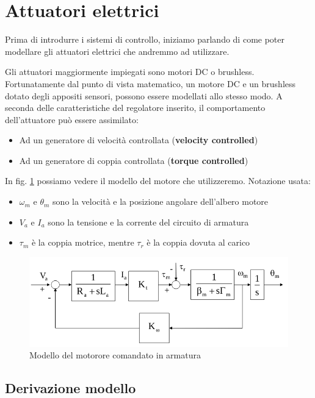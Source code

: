\section{Attuatori elettrici}
Prima di introdurre i sistemi di controllo, iniziamo parlando di come poter modellare gli attuatori elettrici che andremmo ad utilizzare.

Gli attuatori maggiormente impiegati sono motori DC o brushless. Fortunatamente dal punto di vista matematico, un motore DC e un brushless dotato degli appositi sensori, possono essere modellati allo stesso modo.
A seconda delle caratteristiche del regolatore inserito, il comportamento dell’attuatore può essere assimilato:
\begin{itemize}
	\item Ad un generatore di velocità controllata (\textbf{velocity controlled})
	\item Ad un generatore di coppia controllata (\textbf{torque controlled})
\end{itemize}

In fig. \ref{fig:electricactuator1} possiamo vedere il modello del motore che utilizzeremo. Notazione usata:

\begin{itemize}
	\item $\omega_m$ e $\theta_m$ sono la velocità e la posizione angolare dell’albero
	motore
	\item $V_a$ e $I_a$ sono la tensione e la corrente del circuito di armatura
	\item $\tau_m$ è la coppia motrice, mentre $\tau_r$ è la coppia dovuta al carico
\end{itemize}

\begin{figure}[th!]
	\centering
	\includegraphics[width=0.7\linewidth]{images/electric_actuator_1}
	\caption{Modello del motorore comandato in armatura}
	\label{fig:electricactuator1}
\end{figure}


\subsection{Derivazione modello}

